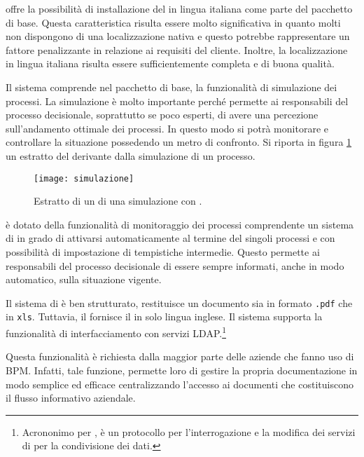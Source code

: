 \progname offre la possibilità di installazione del \sw in lingua italiana come parte del pacchetto di base. Questa caratteristica risulta essere molto significativa in quanto molti \sw non dispongono di una localizzazione nativa e questo potrebbe rappresentare un fattore penalizzante in relazione ai requisiti del cliente. Inoltre, la localizzazione in lingua italiana risulta essere sufficientemente completa e di buona qualità.

Il sistema \progname comprende nel pacchetto di base, la funzionalità di simulazione dei processi. La simulazione è molto importante perché permette ai responsabili del processo decisionale, soprattutto se poco esperti, di avere una percezione sull'andamento ottimale dei processi. In questo modo si potrà monitorare e controllare la situazione possedendo un metro di confronto.
Si riporta in figura \ref{fig:simulazione} un estratto del  derivante dalla simulazione di un processo.

\begin{figure}[H]
  \centering
  \texttt{[image: simulazione]}
  \caption{Estratto di un  di una simulazione con \progname.}
  \label{fig:simulazione}
\end{figure}

\progname è dotato della funzionalità di monitoraggio dei processi comprendente un sistema di  in grado di attivarsi automaticamente al termine del singoli processi e con possibilità di impostazione di tempistiche intermedie. Questo permette ai responsabili del processo decisionale di essere sempre informati, anche in modo automatico, sulla situazione vigente.

Il sistema di  è ben strutturato, restituisce un documento sia in formato \texttt{.pdf} che in \texttt{xls}. Tuttavia, il \sw fornisce il  in solo lingua inglese. Il sistema supporta la funzionalità di interfacciamento con servizi LDAP.\footnote{Acrononimo per , è un protocollo  per l'interrogazione e la modifica dei servizi di  per la condivisione dei dati.\label{note:ldap}}

Questa funzionalità è richiesta dalla maggior parte delle aziende che fanno uso di \sw BPM\@. Infatti, tale funzione, permette loro di gestire la propria documentazione in modo semplice ed efficace centralizzando l'accesso ai documenti che costituiscono il flusso informativo aziendale.

